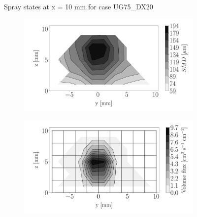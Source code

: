 \begin{figure}[h!]
\begin{subfigure}[b]{0.3\textwidth}
\end{subfigure}
\caption{Spray states at x = 10 mm for case UG75\_DX20}
\label{fig:injectors_sli_uG75_dx20_x10}
\end{figure}




\begin{figure}[h!]
\centering
\begin{subfigure}[b]{0.3\textwidth}
	\centering
   \includegraphics[scale=\scaleSLIJICF]{./part2_developments/figures_ch5_resolved_JICF/injectors_SLI/uG75_dx20_x15_SMD_map}
\end{subfigure}
   \hspace{0.17in}
\begin{subfigure}[b]{0.3\textwidth}
	\centering
   \includegraphics[scale=\scaleSLIJICF]{./part2_developments/figures_ch5_resolved_JICF/injectors_SLI/uG75_dx20_x15_volume_flux_map}
\end{subfigure}
   \hspace{0.17in}

\end{figure}

